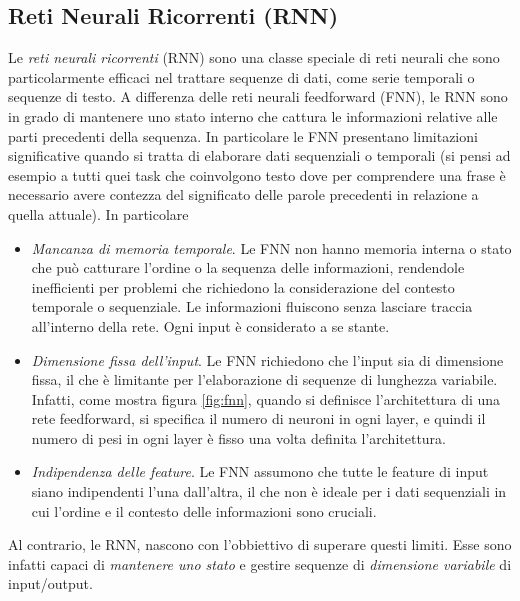 \documentclass[12pt,a4paper,twoside,openright]{book}
\begin{document}
\subsection{Reti Neurali Ricorrenti (RNN)}
Le \emph{reti neurali ricorrenti} (RNN) sono una classe speciale di reti neurali che sono particolarmente efficaci nel trattare sequenze di dati, come serie temporali o sequenze di testo. A differenza delle reti neurali feedforward (FNN), le RNN sono in grado di mantenere uno stato interno che cattura le informazioni relative alle parti precedenti della sequenza.
In particolare le FNN presentano limitazioni significative quando si tratta di elaborare dati sequenziali o temporali (si pensi ad esempio a tutti quei task che coinvolgono testo dove per comprendere una frase è necessario avere contezza del significato delle parole precedenti in relazione a quella attuale). In particolare
\begin{itemize}
    \item \emph{Mancanza di memoria temporale}. Le FNN non hanno memoria interna o stato che può catturare l'ordine o la sequenza delle informazioni, rendendole inefficienti per problemi che richiedono la considerazione del contesto temporale o sequenziale. Le informazioni fluiscono senza lasciare traccia all'interno della rete. Ogni input è considerato a se stante. 
    \item \emph{Dimensione fissa dell'input}. Le FNN richiedono che l'input sia di dimensione fissa, il che è limitante per l'elaborazione di sequenze di lunghezza variabile. Infatti, come mostra figura \ref{fig:fnn}, quando si definisce l'architettura di una rete feedforward, si specifica il numero di neuroni in ogni layer, e quindi il numero di pesi in ogni layer è fisso una volta definita l'architettura. 
    \item \emph{Indipendenza delle feature}. Le FNN assumono che tutte le feature di input siano indipendenti l'una dall'altra, il che non è ideale per i dati sequenziali in cui l'ordine e il contesto delle informazioni sono cruciali.
\end{itemize}
Al contrario, le RNN, nascono con l'obbiettivo di superare questi limiti. Esse sono infatti capaci di \emph{mantenere uno stato} e gestire sequenze di \emph{dimensione variabile} di input/output.
\end{document}
